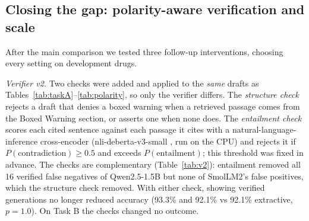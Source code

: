 \documentclass[conference]{IEEEtran}
\begin{document}
\begin{table}[t]
\caption{Task B, lay question per drug: cited passages from the gold label section (89 test drugs)}
\label{tab:taskB}
\centering
\setlength{\tabcolsep}{3.2pt}
\end{table}

\subsection{Closing the gap: polarity-aware verification and scale}
After the main comparison we tested three follow-up interventions, choosing every setting on development drugs.

\emph{Verifier v2.} Two checks were added and applied to the \emph{same} drafts as Tables~\ref{tab:taskA}--\ref{tab:polarity}, so only the verifier differs. The \emph{structure check} rejects a draft that denies a boxed warning when a retrieved passage comes from the Boxed Warning section, or asserts one when none does. The \emph{entailment check} scores each cited sentence against each passage it cites with a natural-language-inference cross-encoder (nli-deberta-v3-small \cite{he2023debertav3}, run on the CPU) and rejects it if $P(\text{contradiction})\geq 0.5$ and exceeds $P(\text{entailment})$; this threshold was fixed in advance. The checks are complementary (Table~\ref{tab:v2}): entailment removed all 16 verified false negatives of Qwen2.5-1.5B but none of SmolLM2's false positives, which the structure check removed. With either check, showing verified generations no longer reduced accuracy (93.3\% and 92.1\% vs 92.1\% extractive, $p=1.0$). On Task B the checks changed no outcome.
\end{document}
